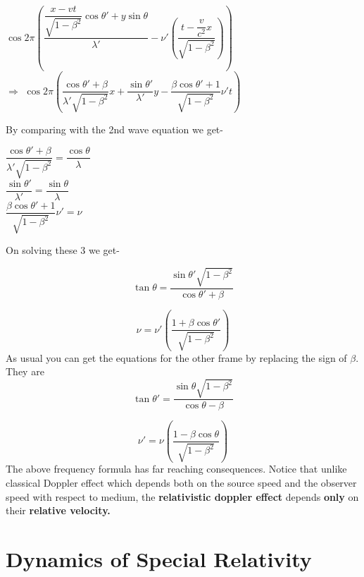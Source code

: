 \documentclass[12pt,a4paper]{article}
\numberwithin{table}{section}
\numberwithin{figure}{section}
\numberwithin{equation}{section}
\theoremstyle{remark}
\theoremstyle{definition}
\begin{document}
\begin{center}
$\cos{2\pi(\dfrac{\dfrac{x-vt}{ \sqrt{1-\beta^2}}\cos{\theta'}+y\sin{\theta}}{\lambda'}-\nu'(\dfrac{t-\dfrac{v}{c^2}x}{\sqrt{1-\beta^2}}))} $\\
$\Rightarrow$
$\cos{2\pi(\dfrac{\cos{\theta'}+\beta}{\lambda'\sqrt{1-\beta^2}}x+\dfrac{\sin{\theta'}}{\lambda'}y-\dfrac{\beta\cos{\theta'}+1}{\sqrt{1-\beta^2}}\nu't)} $

\end{center}
By comparing with the 2nd wave equation we get-
\begin{center}



$\dfrac{\cos{\theta'}+\beta}{\lambda'\sqrt{1-\beta^2}}=\dfrac{\cos{\theta}}{\lambda}$ \\
$\dfrac{\sin{\theta'}}{\lambda'}=\dfrac{\sin{\theta}}{\lambda} $\\
$\dfrac{\beta\cos{\theta'}+1}{\sqrt{1-\beta^2}}\nu'=\nu$\\

\end{center}
On solving these 3 we get-

\begin{equation}
\tan\theta =\dfrac{\sin{\theta'}\sqrt{1-\beta^2}}{\cos{\theta'}+\beta}
\end{equation}


\begin{equation}
\nu= \nu'(\dfrac{1+\beta\cos{\theta'}}{\sqrt{1-\beta^2}})
\end{equation}
As usual you can get the equations for the other frame by replacing the sign of $\beta$. They are
\begin{equation}
\tan\theta' =\dfrac{\sin{\theta}\sqrt{1-\beta^2}}{\cos{\theta}-\beta}
\end{equation}


\begin{equation}
\nu'= \nu(\dfrac{1-\beta\cos{\theta}}{\sqrt{1-\beta^2}})
\end{equation}
The above frequency formula has far reaching consequences. Notice that unlike classical Doppler effect which depends both on the source speed and the observer speed with respect to medium, the \textbf{relativistic doppler effect} depends \textbf{only} on their \textbf{relative velocity.}

\section{Dynamics of Special Relativity}
\end{document}
